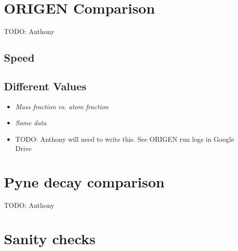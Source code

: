 \documentclass{article}
\makeatletter
\newcommand\todo[1]{{\color{red}TODO\@: #1}}
\makeatother
\begin{document}
\section{ORIGEN Comparison}
\todo{Anthony}
\subsection{Speed}
\label{sec:origen-speed}

\subsection{Different Values}
\begin{itemize}
\item \it{Mass fraction vs. atom fraction}
\item {\it Same data}
\item \todo{Anthony will need to write this. See ORIGEN run logs in Google Drive}
\end{itemize}

\section{Pyne decay comparison}
\todo{Anthony}

\section{Sanity checks}
\label{sec:sanity-checks}


\clearpage

\end{document}
